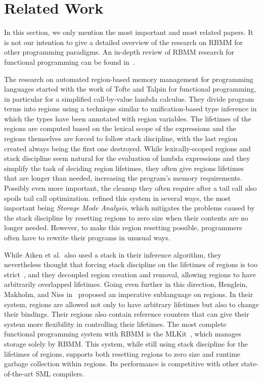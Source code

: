 \documentclass{tlp}
\begin{document}
\section{Related Work}
\label{seCrelatedwork}

In this section, we only mention the most important and most related papers.
It is not our intention to give a detailed overview of the
research on RBMM for other programming paradigms.
An in-depth review of RBMM research for functional programming
can be found in~\cite{Tofte04Retro}.

The research on automated region-based memory management for programming
languages started with the work of Tofte and Talpin
\cite{TofteTalpin97} for functional programming,
in particular for a simplified call-by-value lambda calculus.
They divide program terms into regions
using a technique similar to unification-based type inference
in which the types have been annotated with region variables.
The lifetimes of the regions
are computed based on the lexical scope of the expressions and
the regions themselves are forced to follow stack discipline,
with the last region created always being the first one destroyed.
While lexically-scoped regions and stack discipline
seem natural for the evaluation of lambda expressions
and they simplify the task of deciding region lifetimes,
they often give regions lifetimes that are longer than needed,
increasing the program's memory requirements.
Possibly even more important, the cleanup they often require after a tail call
also spoils tail call optimization.
\cite{Birkedal96from} refined this system in several ways,
the most important being \emph{Storage Mode Analysis},
which mitigates the problems caused by the stack discipline
by resetting regions to zero size when their contents are no longer needed.
However, to make this region resetting possible,
programmers often have to rewrite their programs in unusual ways.

While Aiken et al.\ also used a stack in their inference algorithm,
they nevertheless thought that
forcing stack discipline on the lifetimes of regions
is too strict~\cite{Aiken95better},
and they decoupled region creation and removal,
allowing regions to have arbitrarily overlapped lifetimes.
Going even further in this direction,
Henglein, Makholm, and Niss in~\cite{Henglein01hmn}
proposed an imperative sublanguage on regions.
In their system, regions are allowed not only to have arbitrary lifetimes
but also to change their bindings.
Their regions also contain reference counters
that can give their system more flexibility in controlling their lifetimes.
The most complete functional programming system with RBMM
is the MLKit~\cite{MLKit}, which manages storage solely by RBMM.
This system, while still using stack discipline for the lifetimes of regions,
supports both resetting regions to zero size
and runtime garbage collection within regions.
Its performance is competitive with other state-of-the-art SML compilers.
\end{document}
